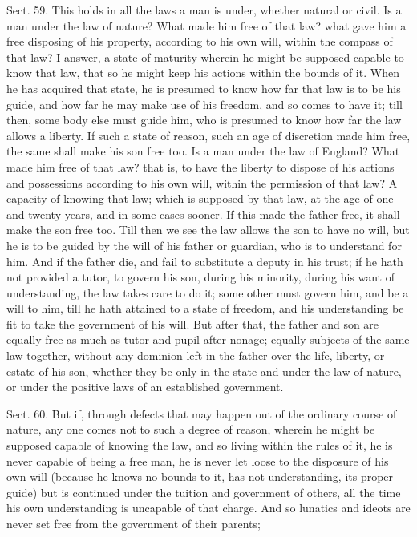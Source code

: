 \documentclass[11pt,openany]{book}
\begin{document}
Sect. 59. This holds in all the laws a man is under, whether natural or civil. Is a man under the law of nature? What made him free of that law? what gave him a free disposing of his property, according to his own will, within the compass of that law? I answer, a state of maturity wherein he might be supposed capable to know that law, that so he might keep his actions within the bounds of it. When he has acquired that state, he is presumed to know how far that law is to be his guide, and how far he may make use of his freedom, and so comes to have it; till then, some body else must guide him, who is presumed to know how far the law allows a liberty. If such a state of reason, such an age of discretion made him free, the same shall make his son free too. Is a man under the law of England? What made him free of that law? that is, to have the liberty to dispose of his actions and possessions according to his own will, within the permission of that law? A capacity of knowing that law; which is supposed by that law, at the age of one and twenty years, and in some cases sooner. If this made the father free, it shall make the son free too. Till then we see the law allows the son to have no will, but he is to be guided by the will of his father or guardian, who is to understand for him. And if the father die, and fail to substitute a deputy in his trust; if he hath not provided a tutor, to govern his son, during his minority, during his want of understanding, the law takes care to do it; some other must govern him, and be a will to him, till he hath attained to a state of freedom, and his understanding be fit to take the government of his will. But after that, the father and son are equally free as much as tutor and pupil after nonage; equally subjects of the same law together, without any dominion left in the father over the life, liberty, or estate of his son, whether they be only in the state and under the law of nature, or under the positive laws of an established government.

Sect. 60. But if, through defects that may happen out of the ordinary course of nature, any one comes not to such a degree of reason, wherein he might be supposed capable of knowing the law, and so living within the rules of it, he is never capable of being a free man, he is never let loose to the disposure of his own will (because he knows no bounds to it, has not understanding, its proper guide) but is continued under the tuition and government of others, all the time his own understanding is uncapable of that charge. And so lunatics and ideots are never set free from the government of their parents;
\end{document}
